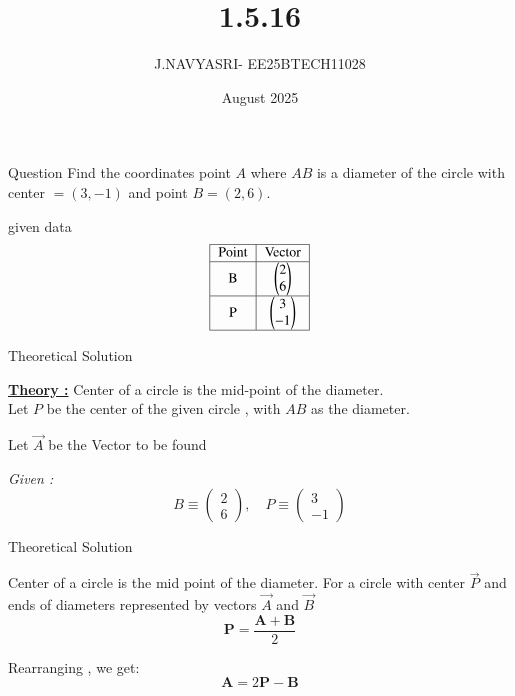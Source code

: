 \documentclass{beamer}
\title %
{1.5.16}
\date{August  2025}
\author %
{J.NAVYASRI- EE25BTECH11028}
\begin{document}
\frame{\titlepage}
\begin{frame}{Question}
Find the  coordinates point \(A\) where  \(AB\) is a diameter of the circle with center \(=(3,-1)\) and point \(B=(2,6)\).
 
\end{frame}
 
\begin{frame}{given data}
 \[
\begin{tabular}[12pt]{ |c| c| c|} 
    \hline
    {Point} & {Vector} \\ 
    \hline
    B & $ \myvec{2 \\ 6} $  \\
    \hline
    P & $ \myvec{3 \\ -1} $   \\
    \hline  
    \end{tabular}
\]

   
\end{frame}

\begin{frame}{Theoretical Solution}

\underline{\textbf{Theory :}} Center of a circle is the mid-point of the diameter. \\

Let $P$ be the center of the given circle , with $AB$ as the diameter.

Let $\vec{A}$ be the Vector to be found 

\textit{Given :} 
\[
B \equiv \begin{pmatrix} 2 \\ 6 \end{pmatrix}, \quad P \equiv \begin{pmatrix} 3 \\ -1 \end{pmatrix}
\]
\end{frame}

\begin{frame}{Theoretical Solution}

Center of a circle is the mid point of the diameter. For a circle with center $\vec{P}$ and ends of diameters represented by vectors $\vec{A}$ and $\vec{B}$  
\[
\mathbf{P} = \frac{\mathbf{A} + \mathbf{B}}{2} \tag{0.1}
\]

Rearranging , we get:
\[
\mathbf{A} = 2\mathbf{P} - \mathbf{B} \tag{0.2}
\]
\end{frame}
\end{document}
